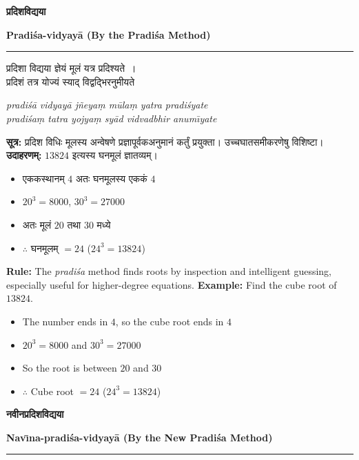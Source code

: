 \documentclass[11pt,a4paper]{article}
\newcommand{\dev}[1]{{\devanagarifont #1}}
\newcommand{\bicol}[2]{%
\noindent%
\begin{minipage}[t]{0.48\textwidth}
\begin{flushleft}
\small
#1
\end{flushleft}
\end{minipage}%
\hfill%
\begin{minipage}[t]{0.48\textwidth}
\begin{flushleft}
\small
#2
\end{flushleft}
\end{minipage}%
\vspace{0.4em}
}
\newcommand{\bicolverse}[2]{%
\par\noindent%
\begin{minipage}[t]{0.48\textwidth}
\centering
\color{versecolor}
\devanagarifont
\small
#1
\end{minipage}%
\hfill%
\begin{minipage}[t]{0.48\textwidth}
\centering
\color{versecolor}
\small
#2
\end{minipage}%
\par\vspace{0.4em}
}
\newcommand{\sectionbicol}[2]{%
\vspace{0.5em}
\noindent%
\begin{minipage}[t]{0.48\textwidth}
\begin{center}
\large\bfseries\color{sectioncolor}
\dev{#1}
\end{center}
\end{minipage}%
\hfill%
\begin{minipage}[t]{0.48\textwidth}
\begin{center}
\large\bfseries\color{sectioncolor}
#2
\end{center}
\end{minipage}%
\vspace{0.3em}
\noindent\rule{\textwidth}{0.4pt}
}
\begin{document}
\clearpage

\sectionbicol{प्रदिशविद्यया}{Pradi\'{s}a-vidyay\={a} (By the Pradi\'{s}a Method)}

\vspace{0.3cm}

\bicolverse{%
प्रदिशा विद्यया ज्ञेयं मूलं यत्र प्रदिश्यते~।\\
प्रदिशं तत्र योज्यं स्याद् विद्वद्भिरनुमीयते~
}{%
\textit{pradi\'{s}\={a} vidyay\={a} j\~{n}eya\d{m} m\={u}la\d{m} yatra pradi\'{s}yate}\\
\textit{pradi\'{s}a\d{m} tatra yojya\d{m} sy\={a}d vidvadbhir anum\={\i}yate}
}

\vspace{0.5cm}

\bicol{%
\textbf{सूत्र:} \dev{प्रदिश} विधिः मूलस्य अन्वेषणे प्रज्ञापूर्वकअनुमानं कर्तुं प्रयुक्ता। उच्चघातसमीकरणेषु विशिष्टा।
\vspace{0.3cm}
\textbf{उदाहरणम्:} $13824$ इत्यस्य घनमूलं ज्ञातव्यम्।
\begin{itemize}[leftmargin=1.5em,topsep=0pt]
\item एककस्थानम् $4$ अतः घनमूलस्य एककं $4$
\item $20^3 = 8000$, $30^3 = 27000$
\item अतः मूलं $20$ तथा $30$ मध्ये
\item $\therefore$ घनमूलम् $= 24$ ($24^3 = 13824$)
\end{itemize}
}{%
\textbf{Rule:} The \textit{pradi\'{s}a} method finds roots by inspection and intelligent guessing, especially useful for higher-degree equations.
\vspace{0.3cm}
\textbf{Example:} Find the cube root of $13824$.
\begin{itemize}[leftmargin=1.5em,topsep=0pt]
\item The number ends in $4$, so the cube root ends in $4$
\item $20^3 = 8000$ and $30^3 = 27000$
\item So the root is between $20$ and $30$
\item $\therefore$ Cube root $= 24$ ($24^3 = 13824$)
\end{itemize}
}

\clearpage

\sectionbicol{नवीनप्रदिशविद्यया}{Nav\={\i}na-pradi\'{s}a-vidyay\={a} (By the New Pradi\'{s}a Method)}
\end{document}
